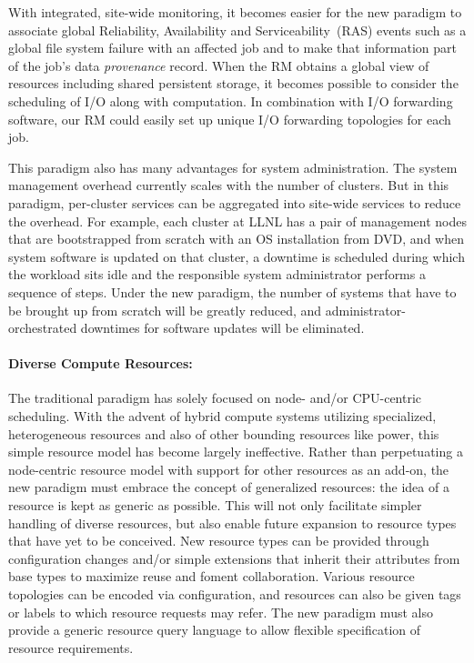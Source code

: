 \documentclass[10pt]{article}
\begin{document}
With integrated, site-wide monitoring, it becomes easier
for the new paradigm to associate global Reliability, Availability and Serviceability~(RAS) 
events such as a global file system
failure with an affected job and to make that information part of
the job's data {\em provenance} record. When the RM obtains a global view of
resources including shared persistent storage, it becomes possible to
consider the scheduling of I/O along with computation. In combination with
I/O forwarding software, our RM could easily set up unique I/O forwarding
topologies for each job.

This paradigm also has many advantages for system administration.
The system management overhead currently scales with the number of clusters.
But in this paradigm, per-cluster services can be aggregated into
site-wide services to reduce the overhead.
For example, each cluster at LLNL has a pair of management
nodes that are bootstrapped from scratch with an OS installation from DVD,
and when system software is updated on that cluster, a downtime is
scheduled during which the workload sits idle and the responsible system
administrator performs a sequence of steps. Under the new paradigm, the
number of systems that have to be brought up from scratch will be
greatly reduced, and administrator-orchestrated downtimes for software
updates will be eliminated. 


\paragraph{Diverse Compute Resources:}
The traditional paradigm has solely focused on node- and/or CPU-centric
scheduling. With the advent of hybrid compute systems utilizing specialized,
heterogeneous resources and also of other bounding resources like power, 
this simple resource model has become largely ineffective. 
Rather than
perpetuating a node-centric resource model with support for other
resources as an add-on, the new paradigm must embrace the concept of generalized resources: 
the idea of a resource is kept as generic as possible. This will not only facilitate 
simpler handling of diverse resources, but also enable future expansion to resource types that have yet to
be conceived. New resource types can be provided through configuration changes
and/or simple extensions that inherit their attributes from base types 
to maximize reuse and foment collaboration. Various resource topologies
can be encoded via configuration, and resources can also be given tags or labels
to which resource requests may refer. 
The new paradigm must also provide a generic resource query language to allow flexible
specification of resource requirements.
\end{document}
